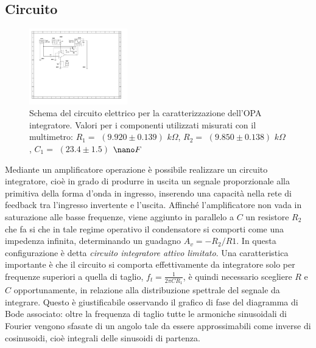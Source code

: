 \documentclass[journal]{IEEEtran}
\begin{document}
\subsection{\textbf{Circuito}}
\begin{figure}[H]%
\begin {center}
\includegraphics[width=0.38\textwidth]{sch-simulations/output/OPA-integratore.pdf}
\caption{Schema  del  circuito  elettrico  per  la  caratterizzazione  dell’OPA integratore.  Valori  per  i  componenti  utilizzati  misurati  con il multimetro: $R_1 =$ $(9.920 \pm 0.139)$ $k\Omega$, $R_2 =$ $(9.850 \pm 0.138)$ $k\Omega$, $C_1 =$ $(23.4 \pm 1.5)$ $\nano F$}
\label{fig:OPA-integ}
\end {center}
\end{figure}
Mediante un amplificatore operazione è possibile realizzare un circuito integratore, cioè in grado di produrre in uscita un segnale proporzionale alla primitiva della forma d'onda in ingresso, inserendo una capacità nella rete di feedback tra l'ingresso invertente e l'uscita.
Affinché l'amplificatore non vada in saturazione alle basse frequenze, viene aggiunto in parallelo a $C$ un resistore $R_{2}$ che fa si che in tale regime operativo il condensatore si comporti come una impedenza infinita, determinando un guadagno $A_{v}=-R_{2}/R{1}$. In questa configurazione è detta \textit{circuito integratore attivo limitato}. 
Una caratteristica importante è che il circuito si comporta effettivamente da integratore solo per frequenze superiori a quella di taglio, $f_{t}=\frac{1}{2 \pi C R_{1} }$, è quindi necessario scegliere $R$ e $C$ opportunamente, in relazione alla distribuzione spettrale del segnale da integrare. Questo è giustificabile osservando il grafico di fase del diagramma di Bode associato: oltre la frequenza di taglio tutte le armoniche sinusoidali di Fourier vengono sfasate di un angolo tale da essere approssimabili come inverse di cosinusoidi, cioè integrali delle sinusoidi di partenza.
\end{document}
